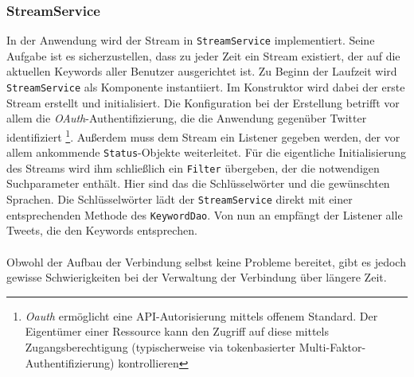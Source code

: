 \subsubsection*{StreamService}
In der Anwendung wird der Stream in \texttt{StreamService} implementiert. Seine Aufgabe ist es 
sicherzustellen, dass zu jeder Zeit ein Stream existiert, der auf die aktuellen Keywords aller 
Benutzer ausgerichtet ist. Zu Beginn der Laufzeit wird \texttt{StreamService} als Komponente 
instantiiert. Im Konstruktor wird dabei der erste Stream erstellt und initialisiert. Die Konfiguration 
bei der Erstellung betrifft vor allem die \textit{OAuth}-Authentifizierung, die die Anwendung 
gegenüber Twitter identifiziert \footnote{\textit{Oauth} ermöglicht eine API-Autorisierung mittels offenem Standard. Der Eigentümer einer Ressource kann den Zugriff auf diese mittels Zugangsberechtigung (typischerweise via tokenbasierter Multi-Faktor-Authentifizierung) kontrollieren}. Außerdem muss dem Stream ein Listener gegeben werden, der vor allem ankommende 
\texttt{Status}-Objekte weiterleitet. Für die eigentliche Initialisierung des Streams wird ihm schließlich ein 
\texttt{Filter} übergeben, der die notwendigen Suchparameter enthält. Hier sind das die Schlüsselwörter und die 
gewünschten Sprachen. Die Schlüsselwörter lädt der \texttt{StreamService} direkt mit einer entsprechenden 
Methode des \texttt{KeywordDao}. Von nun an empfängt der Listener alle Tweets, die den Keywords entsprechen. 
\\\\
Obwohl der Aufbau der Verbindung selbst keine Probleme bereitet, gibt es jedoch gewisse Schwierigkeiten 
bei der Verwaltung der Verbindung über längere Zeit.
